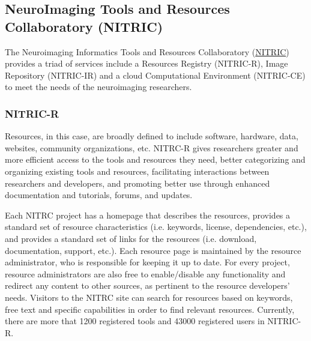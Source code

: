 \subsection{NeuroImaging Tools and Resources Collaboratory (NITRIC)} 
The Neuroimaging Informatics Tools and Resources Collaboratory
(\href{www.nitrc.org}{NITRIC}) provides a triad of services include a Resources Registry (NITRIC-R), Image Repository (NITRIC-IR) and a cloud Computational Environment (NITRIC-CE) to meet the needs of the neuroimaging researchers\cite{kennedy2016nitrc,howToCiteNITRIC_website}.



\subsubsection{NITRIC-R}

Resources, in this case, are broadly deﬁned to include software, hardware, data,
websites, community organizations, etc. NITRC-R gives researchers greater and more efficient access to the tools and resources they need, better categorizing and organizing existing tools and resources, facilitating interactions between researchers and developers, and promoting better use through enhanced documentation and tutorials, forums, and updates. 

Each NITRC project has a homepage that describes the resources, provides
a standard set of resource characteristics (i.e. keywords, license,
dependencies, etc.), and provides a standard set of links for the resources
(i.e. download, documentation, support, etc.). Each resource page is
maintained by the resource administrator, who is responsible for
keeping it up to date. For every
project, resource administrators are also free to enable/disable any
functionality and redirect any content to other sources, as pertinent to
the resource developers' needs. Visitors to the NITRC site can search
for resources based on keywords, free text and speciﬁc capabilities in
order to ﬁnd relevant resources. Currently, there are more that 1200 registered tools and 43000 registered users in NITRIC-R. 

